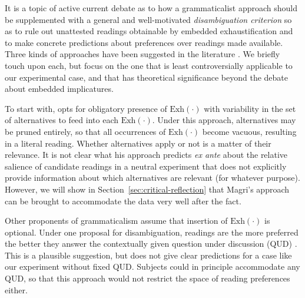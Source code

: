\documentclass[fleqn,reqno,10pt]{article}
\newcommand{\exh}{\ensuremath{\mathrm{Exh}}}
\begin{document}
It is a topic of active current debate as to how a grammaticalist
approach should be supplemented with a general and well-motivated
\emph{disambiguation criterion} so as to rule out unattested readings
obtainable by embedded exhaustification and to make concrete
predictions about preferences over readings made
available. %
Three kinds of approaches have been suggested in the literature
\citep[c.f.][]{ChemlaSingh2014:Remarks-on-the-}. We briefly touch upon
each, but focus on the one that is least controversially applicable to
our experimental case, and that has theoretical significance beyond
the debate about embedded implicatures. 

To start with,
\citet{Magri2009:A-Theory-of-Ind,Magri2011:Another-Argumen} opts for
obligatory presence of $\exh(\cdot)$ with variability in the set of
alternatives to feed into each $\exh(\cdot)$. Under this approach,
alternatives may be pruned entirely, so that all occurrences of
$\exh(\cdot)$ become vacuous, resulting in a literal reading. Whether
alternatives apply or not is a matter of their relevance. It is not
clear what his approach predicts \emph{ex ante} about the relative
salience of candidate readings in a neutral experiment that does not
explicitly provide information about which alternatives are relevant
(for whatever purpose). However, we will show in
Section~\ref{sec:critical-reflection} that Magri's approach can be
brought to accommodate the data very well after the fact.

Other proponents of grammaticalism assume that insertion of $\exh(\cdot)$ is
optional. Under one proposal for disambiguation, readings are the more
preferred the better they answer the contextually given question under
discussion (QUD)
\citep[e.g.][]{Fox2007:Free-Choice-and,GualminiHulsey2008:The-Question-An}. This
is a plausible suggestion, but does not give clear predictions for a
case like our experiment without fixed QUD. Subjects could in
principle accommodate any QUD, so that this approach would not
restrict the space of reading preferences either.
\end{document}
